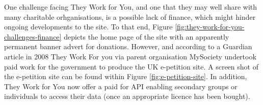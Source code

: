 One challenge facing They Work for You, and one that they may well share with many charitable orhganisations, is a possible lack of finance, which might hinder ongoing developments to the site.
To that end, Figure \ref{fig:they-work-for-you-challenges-finance} depicts the home page of the site with an apparently permanent banner advert for donations.
However, and according to a Guardian article in 2008 \cite{guardian-tom-steinberg} They Work For you via parent organisation MySociety undertook paid work for the government to produce the UK e-petition site.
A screen shot of the e-petition site can be found within Figure \ref{fig:e-petition-site}.
In addition, They Work for You now offer a paid for API enabling secondary groups or individuals to access their data (once an appropriate licence has been bought).